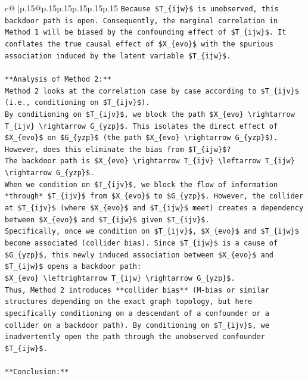 \documentclass{article}
\begin{document}
{\begin{supertabular}{c@{$\;$}|p{.15\linewidth}@{}p{.15\linewidth}p{.15\linewidth}p{.15\linewidth}p{.15\linewidth}p{.15\linewidth}}
{{{\texttt{Because \$T\_\{ijw\}\$ is unobserved, this backdoor path is open. Consequently, the marginal correlation in Method 1 will be biased by the confounding effect of \$T\_\{ijw\}\$. It conflates the true causal effect of \$X\_\{evo\}\$ with the spurious association induced by the latent variable \$T\_\{ijw\}\$.} \\
\\ 
\texttt{**Analysis of Method 2:**} \\
\texttt{Method 2 looks at the correlation case by case according to \$T\_\{ijv\}\$ (i.e., conditioning on \$T\_\{ijv\}\$).} \\
\texttt{By conditioning on \$T\_\{ijv\}\$, we block the path \$X\_\{evo\} \textbackslash{}rightarrow T\_\{ijv\} \textbackslash{}rightarrow G\_\{yzp\}\$. This isolates the direct effect of \$X\_\{evo\}\$ on \$G\_\{yzp\}\$ (the path \$X\_\{evo\} \textbackslash{}rightarrow G\_\{yzp\}\$).} \\
\texttt{However, does this eliminate the bias from \$T\_\{ijw\}\$?} \\
\texttt{The backdoor path is \$X\_\{evo\} \textbackslash{}rightarrow T\_\{ijv\} \textbackslash{}leftarrow T\_\{ijw\} \textbackslash{}rightarrow G\_\{yzp\}\$.} \\
\texttt{When we condition on \$T\_\{ijv\}\$, we block the flow of information *through* \$T\_\{ijv\}\$ from \$X\_\{evo\}\$ to \$G\_\{yzp\}\$. However, the collider at \$T\_\{ijv\}\$ (where \$X\_\{evo\}\$ and \$T\_\{ijw\}\$ meet) creates a dependency between \$X\_\{evo\}\$ and \$T\_\{ijw\}\$ given \$T\_\{ijv\}\$.} \\
\texttt{Specifically, once we condition on \$T\_\{ijv\}\$, \$X\_\{evo\}\$ and \$T\_\{ijw\}\$ become associated (collider bias). Since \$T\_\{ijw\}\$ is a cause of \$G\_\{yzp\}\$, this newly induced association between \$X\_\{evo\}\$ and \$T\_\{ijw\}\$ opens a backdoor path:} \\
\texttt{\$X\_\{evo\} \textbackslash{}leftrightarrow T\_\{ijw\} \textbackslash{}rightarrow G\_\{yzp\}\$.} \\
\texttt{Thus, Method 2 introduces **collider bias** (M{-}bias or similar structures depending on the exact graph topology, but here specifically conditioning on a descendant of a confounder or a collider on a backdoor path). By conditioning on \$T\_\{ijv\}\$, we inadvertently open the path through the unobserved confounder \$T\_\{ijw\}\$.} \\
\\ 
\texttt{**Conclusion:**} \\
}}}
\end{supertabular}}
\end{document}
